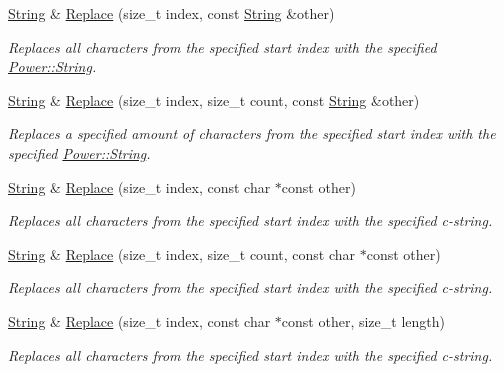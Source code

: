 \begin{DoxyCompactItemize}
\hyperlink{class_power_1_1_string}{String} \& \hyperlink{class_power_1_1_string_ab0a52e24022cf0b22d7af6264ecc4c98}{Replace} (size\+\_\+t index, const \hyperlink{class_power_1_1_string}{String} \&other)
\begin{DoxyCompactList}\small\item\em Replaces all characters from the specified start index with the specified \hyperlink{class_power_1_1_string}{Power\+::\+String}. \end{DoxyCompactList}\item 
\hyperlink{class_power_1_1_string}{String} \& \hyperlink{class_power_1_1_string_a158278232a6b714c2bb5ce3a9cbf9642}{Replace} (size\+\_\+t index, size\+\_\+t count, const \hyperlink{class_power_1_1_string}{String} \&other)
\begin{DoxyCompactList}\small\item\em Replaces a specified amount of characters from the specified start index with the specified \hyperlink{class_power_1_1_string}{Power\+::\+String}. \end{DoxyCompactList}\item 
\hyperlink{class_power_1_1_string}{String} \& \hyperlink{class_power_1_1_string_ad94fc777a94a27590e93c32b86c6f84b}{Replace} (size\+\_\+t index, const char $\ast$const other)
\begin{DoxyCompactList}\small\item\em Replaces all characters from the specified start index with the specified c-\/string. \end{DoxyCompactList}\item 
\hyperlink{class_power_1_1_string}{String} \& \hyperlink{class_power_1_1_string_aa22a5533bc6b831a6985fe55591508df}{Replace} (size\+\_\+t index, size\+\_\+t count, const char $\ast$const other)
\begin{DoxyCompactList}\small\item\em Replaces all characters from the specified start index with the specified c-\/string. \end{DoxyCompactList}\item 
\hyperlink{class_power_1_1_string}{String} \& \hyperlink{class_power_1_1_string_ab20eff7cedd6965f29dececf8a9e4354}{Replace} (size\+\_\+t index, const char $\ast$const other, size\+\_\+t length)
\begin{DoxyCompactList}\small\item\em Replaces all characters from the specified start index with the specified c-\/string. \end{DoxyCompactList}\item 

\end{DoxyCompactItemize}
